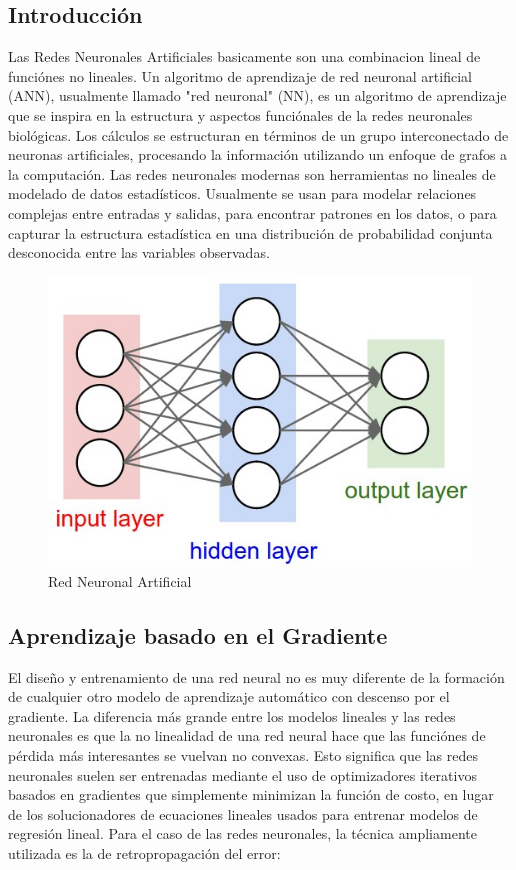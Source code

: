 \documentclass[a4paper,11pt,spanish]{book}
\begin{document}
      \subsection{Introducción}
	Las Redes Neuronales Artificiales basicamente son una combinacion lineal de funciónes no lineales.
	Un algoritmo de aprendizaje de red neuronal artificial (ANN), usualmente llamado "red neuronal" (NN), es un algoritmo de aprendizaje que se inspira en la estructura y aspectos funciónales
	de la redes neuronales biológicas. Los cálculos se estructuran en términos de un grupo interconectado de neuronas artificiales, procesando la información utilizando un enfoque de grafos
	a la computación. Las redes neuronales modernas son herramientas no lineales de modelado de datos estadísticos. Usualmente se usan para modelar relaciones complejas entre entradas y salidas,
	para encontrar patrones en los datos, o para capturar la estructura estadística en una distribución de probabilidad conjunta desconocida entre las variables observadas. \\
	\begin{figure}[h]
	  \includegraphics[scale=0.5]{./img/stanford_neural_net.jpeg}
	  \caption{Red Neuronal Artificial}
	  \label{fig:neural_network}
	\end{figure}

      \subsection{Aprendizaje basado en el Gradiente}
	El diseño y entrenamiento de una red neural no es muy diferente de la formación de cualquier otro modelo de aprendizaje automático con descenso por el gradiente.
	La diferencia más grande entre los modelos lineales y las redes neuronales es que la no linealidad de una red neural hace que las funciónes de pérdida
	más interesantes se vuelvan no convexas. Esto significa que las redes neuronales suelen ser entrenadas mediante el uso de optimizadores iterativos basados ​​en gradientes
	que simplemente minimizan la función de costo, en lugar de los solucionadores de ecuaciones lineales usados ​​para entrenar modelos de regresión lineal. Para el caso de las
	redes neuronales, la técnica ampliamente utilizada es la de retropropagación del error:
\end{document}
